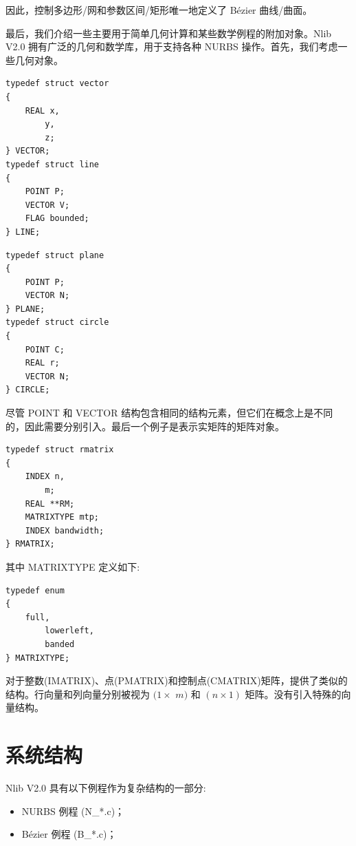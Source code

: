\documentclass[../main.tex]{subfiles}
\begin{document}
因此，控制多边形/网和参数区间/矩形唯一地定义了 Bézier 曲线/曲面。

最后，我们介绍一些主要用于简单几何计算和某些数学例程的附加对象。Nlib V2.0 拥有广泛的几何和数学库，用于支持各种 NURBS 操作。首先，我们考虑一些几何对象。

\begin{verbatim}
typedef struct vector
{
    REAL x,
        y,
        z;
} VECTOR;
typedef struct line
{
    POINT P;
    VECTOR V;
    FLAG bounded;
} LINE;
\end{verbatim}

\begin{verbatim}
typedef struct plane
{
    POINT P;
    VECTOR N;
} PLANE;
typedef struct circle
{
    POINT C;
    REAL r;
    VECTOR N;
} CIRCLE;
\end{verbatim}

尽管 POINT 和 VECTOR 结构包含相同的结构元素，但它们在概念上是不同的，因此需要分别引入。最后一个例子是表示实矩阵的矩阵对象。

\begin{verbatim}
typedef struct rmatrix
{
    INDEX n,
        m;
    REAL **RM;
    MATRIXTYPE mtp;
    INDEX bandwidth;
} RMATRIX;
\end{verbatim}

其中 MATRIXTYPE 定义如下:

\begin{verbatim}
typedef enum
{
    full,
        lowerleft,
        banded
} MATRIXTYPE;
\end{verbatim}

对于整数(IMATRIX)、点(PMATRIX)和控制点(CMATRIX)矩阵，提供了类似的结构。行向量和列向量分别被视为 \((1 \times\)  \(m)\) 和 \(\left( {n \times  1}\right)\) 矩阵。没有引入特殊的向量结构。


\section{系统结构}
Nlib V2.0 具有以下例程作为复杂结构的一部分:

\begin{itemize}
\item NURBS 例程 (N\_*.c)；
\end{itemize}

\begin{itemize}
\item Bézier 例程 (B\_*.c)；
\end{itemize}
\end{document}
